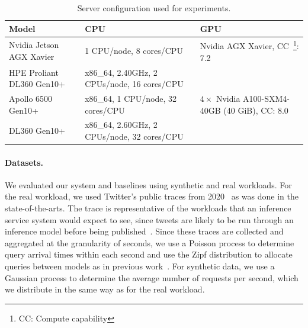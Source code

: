 \begin{table}
	\centering
	\begin{tabular}{p{2cm}p{3cm}p{3cm}}
		\toprule
		\textbf{Model}            & \textbf{CPU}                                & \textbf{GPU}                                                 \\
		\toprule

		Nvidia Jetson AGX Xavier  & 1 CPU/node, 8 cores/CPU                     & Nvidia AGX Xavier, CC~\footnote{CC: Compute capability}: 7.2 \\

		\midrule

		HPE Proliant DL360 Gen10+ & x86\_64, 2.40GHz, 2 CPUs/node, 16 cores/CPU &                                                              \\

		\midrule

		Apollo 6500 Gen10+        & x86\_64, 1 CPU/node, 32 cores/CPU           & $4\times$ Nvidia A100-SXM4-40GB (40 GiB), CC: 8.0            \\

		\midrule

		DL360 Gen10+              & x86\_64, 2.60GHz, 2 CPUs/node, 32 cores/CPU &                                                              \\

		\bottomrule
	\end{tabular}
	\caption{Server conﬁguration used for experiments.}
	\label{tab:serve_config}
\end{table}

\paragraph{Datasets.} We evaluated our system and baselines using synthetic and real workloads. For the real workload, we used Twitter's public traces from 2020~\cite{twitterStreamTrace2020} as was done in the state-of-the-arts. The trace is representative of the workloads that an inference service system would expect to see, since tweets are likely to be run through an inference model before being published~\cite{francisco2021infaas,ahmad2024proteus}. Since these traces are collected and aggregated at the granularity of seconds, we use a Poisson process to determine query arrival times within each second and use the Zipf distribution to allocate queries between models as in previous work~\cite{ahmad2024proteus,francisco2021infaas}. For synthetic data, we use a Gaussian process to determine the average number of requests per second, which we distribute in the same way as for the real workload.


